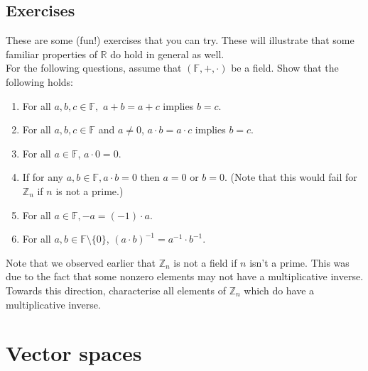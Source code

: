 \documentclass[12pt]{article}
\begin{document}
\subsection{Exercises}
These are some (fun!) exercises that you can try. These will illustrate that some familiar properties of $\mathbb{R}$ do hold in general as well. \\
For the following questions, assume that $(\mathbb{F}, +, \cdot)$ be a field. Show that the following holds:
\begin{enumerate}[nosep] 
	\item For all $a, b, c \in \mathbb{F},$ $a+b=a+c$ implies $b=c$.
    \item For all $a, b, c \in \mathbb{F}$ and $a\neq0$, $a\cdot b = a\cdot c$ implies $b=c$.
    \item For all $ a\in \mathbb{F}$, $a\cdot 0 = 0$.
    \item If for any $a, b \in \mathbb{F}, a\cdot b=0$ then $a=0$ or $b=0$. (Note that this would fail for $\mathbb{Z}_n$ if $n$ is not a prime.)
    \item For all $a \in \mathbb{F}, -a = (-1)\cdot a$.
    \item For all $a, b \in \mathbb{F} \setminus \{0\}$, $(a\cdot b)^{-1} = a^{-1}\cdot b^{-1}.$
\end{enumerate}
Note that we observed earlier that $\mathbb{Z}_n$ is not a field if $n$ isn't a prime. This was due to the fact that some nonzero elements may not have a multiplicative inverse. Towards this direction, characterise all elements of $\mathbb{Z}_n$ which do have a multiplicative inverse.

\section{Vector spaces}
\end{document}
